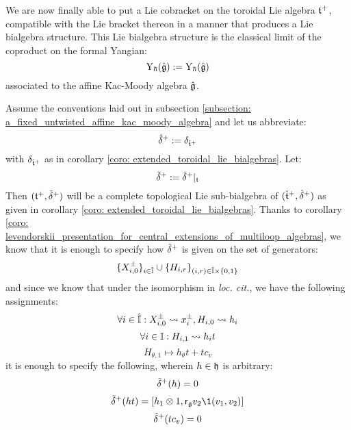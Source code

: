         We are now finally able to put a Lie cobracket on the toroidal Lie algebra $\mathfrak{t}^{+}$, compatible with the Lie bracket thereon in a manner that produces a Lie bialgebra structure. This Lie bialgebra structure is the classical limit of the coproduct on the formal Yangian:
            $$\mathrm{Y}_{\hbar}(\hat{\mathfrak{g}}) := \mathrm{Y}_{\hbar}(\hat{\mathfrak{g}})$$
        associated to the affine Kac-Moody algebra $\hat{\mathfrak{g}}$. 
        \begin{theorem} \label{theorem: toroidal_lie_bialgebras}
            Assume the conventions laid out in subsection \ref{subsection: a_fixed_untwisted_affine_kac_moody_algebra} and let us abbreviate:
                $$\hat{\delta}^{+} := \delta_{\hat{\mathfrak{t}}^{+}}$$
            with $\delta_{\hat{\mathfrak{t}}^{+}}$ as in corollary \ref{coro: extended_toroidal_lie_bialgebras}. Let:
                $$\tilde{\delta}^{+} := \hat{\delta}^{+}|_{\mathfrak{t}}$$
            Then $(\mathfrak{t}^{+}, \tilde{\delta}^{+})$ will be a complete topological Lie sub-bialgebra of $(\hat{\mathfrak{t}}^{+}, \hat{\delta}^{+})$ as given in corollary \ref{coro: extended_toroidal_lie_bialgebras}. Thanks to corollary \ref{coro: levendorskii_presentation_for_central_extensions_of_multiloop_algebras}, we know that it is enough to specify how $\tilde{\delta}^{+}$ is given on the set of generators:
                $$\{X_{i, 0}^{\pm}\}_{i \in \hat{\simpleroots}} \cup \{H_{i, r}\}_{ (i, r) \in \hat{\simpleroots} \x \{0, 1\} }$$
            and since we know that under the isomorphism in \textit{loc. cit.}, we have the following assignments:
                $$\forall i \in \hat{\mathbb{I}}: X_{i, 0}^{\pm} \leadsto x_i^{\pm}, H_{i, 0} \leadsto h_i$$
                $$\forall i \in \mathbb{I}: H_{i, 1} \leadsto h_i t$$
                $$H_{\theta, 1} \mapsto h_{\theta} t + t c_v$$
            it is enough to specify the following, wherein $h \in \mathfrak{h}$ is arbitrary:
                $$\tilde{\delta}^{+}(h) = 0$$
                $$\tilde{\delta}^{\positive}(ht) = [h_1 \tensor 1, \sfr_{\g} v_2 \1(v_1, v_2)]$$
                $$\tilde{\delta}^{+}(t c_v) = 0$$
        \end{theorem}
